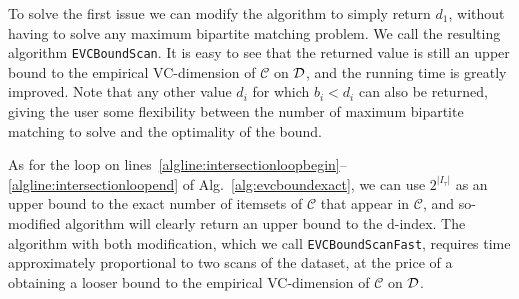 To solve the first issue we can modify the algorithm to simply return $d_1$,
without having to solve any maximum bipartite matching problem. We call the
resulting algorithm \texttt{EVCBoundScan}. It is easy to see that the returned
value is still an upper bound to the empirical VC-dimension of $\mathcal{C}$ on
${\cal D}$, and the running time is greatly improved. Note that any other value
$d_i$ for which $b_i < d_i$ can also be returned, giving the user some
flexibility between the number of maximum bipartite matching to solve and the
optimality of the bound.
%
%


As for the loop on
lines~\ref{algline:intersectionloopbegin}--\ref{algline:intersectionloopend} of
Alg.~\ref{alg:evcboundexact}, we can use $2^{|I_\tau|}$ as an upper bound to the
exact number of itemsets of $\mathcal{C}$ that appear in $\mathcal{C}$, and
so-modified algorithm will clearly return an upper bound to the d-index. The
algorithm with both modification, which we call \texttt{EVCBoundScanFast},
requires time approximately proportional to two scans of the dataset, at the
price of a obtaining a looser bound to the empirical VC-dimension of
$\mathcal{C}$ on ${\cal D}$.

